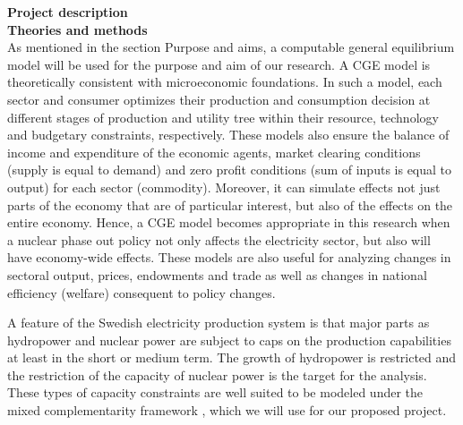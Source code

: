\textbf{Project description}\\
\textbf{Theories and methods}\\
As mentioned in the section Purpose and aims, a computable general equilibrium model will be used for the purpose and aim of our research. A CGE model is theoretically consistent with microeconomic foundations. In such a model, each sector and consumer optimizes their production and consumption decision at different stages of production and utility tree within their resource, technology and budgetary constraints, respectively. These models also ensure the balance of income and expenditure of the economic agents, market clearing conditions (supply is equal to demand) and zero profit conditions (sum of inputs is equal to output) for each sector (commodity). Moreover, it can simulate effects not just parts of the economy that are of particular interest, but also of the effects on the entire economy. Hence, a CGE model becomes appropriate in this research when a nuclear phase out policy not only affects the electricity sector, but also will have economy-wide effects. These models are also useful for analyzing changes in sectoral output, prices, endowments and trade as well as changes in national efficiency (welfare) consequent to policy changes.

A feature of the Swedish electricity production system is that major parts as hydropower and nuclear power are subject to caps on the production capabilities at least in the short or medium term. The growth of hydropower is restricted and the restriction of the capacity of nuclear power is the target for the analysis. These types of capacity constraints are well suited to be modeled under the mixed complementarity framework \citep{raey}, which we will use for our proposed project.\\

